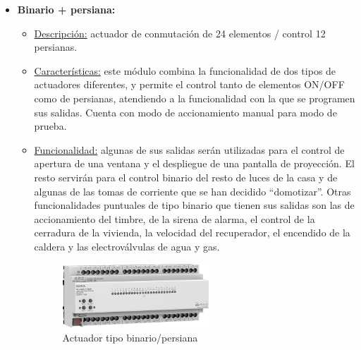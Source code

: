 \begin{itemize}
\item \textbf{Binario + persiana:} 
	\begin{itemize}
	\item\underline{Descripción:} actuador de conmutación de 24 elementos / control 12 persianas.
	\item \underline{Características:} este módulo combina la funcionalidad de dos tipos de actuadores diferentes, y permite el control tanto de elementos ON/OFF como de persianas, atendiendo a la funcionalidad con la que se programen sus salidas. Cuenta con modo de accionamiento manual para modo de prueba.
	\item \underline{Funcionalidad:} algunas de sus salidas serán utilizadas para el control de apertura de una ventana y el despliegue de una pantalla de proyección. El resto servirán para el control binario del resto de luces de la casa y de algunas de las tomas de corriente que se han decidido “domotizar”. Otras funcionalidades puntuales de tipo binario que tienen sus salidas son las de accionamiento del timbre, de la sirena de alarma, el control de la cerradura de la vivienda, la velocidad del recuperador, el encendido de la caldera y las electroválvulas de agua y gas.
	\begin{figure}[h]
	\centering
	\includegraphics[width=0.55\textwidth]{figures/actuador_binario.png}   
	\caption{Actuador tipo binario/persiana}
	\label{fig:actuador_binario}
	\end{figure}
	\end{itemize} 


\end{itemize}
